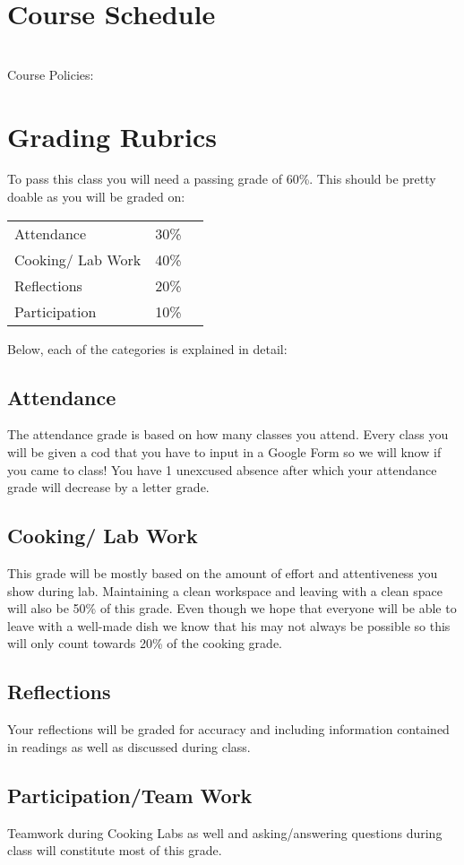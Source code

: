 \documentclass{article}
\begin{document}
\section*{Course Schedule }\\
Course Policies: 

\section{Grading Rubrics} 


To pass this class you will need a passing grade of 60\%. This should be pretty doable as you will be graded on:

\begin{table}[h]
\begin{tabular}{lll}
 Attendance &  30\% \\
 Cooking/ Lab Work & 40\%  \\
 Reflections &  20\%  \\
 Participation & 10\% \\ 
\end{tabular}
\end{table}   

Below, each of the categories is explained in detail:
\subsection{Attendance}
 The attendance grade is based on how many classes you attend. Every class you will be given a cod that you have to input in a Google Form so we will know if you came to class! You have 1 unexcused absence after which  your attendance grade will decrease by a letter grade.

\subsection{Cooking/ Lab Work} This grade will be mostly based on the amount of effort and attentiveness you show during lab. Maintaining a clean workspace and leaving with a clean space will also be 50\% of this grade. Even though we hope that everyone will be able to leave with a well-made dish we know that his may not always be possible so this will only count towards 20\% of the cooking grade.

\subsection{Reflections} Your reflections will be graded for accuracy and including information contained in readings as well as discussed during class.

\subsection{Participation/Team Work} Teamwork during Cooking Labs as well and asking/answering questions during class will constitute most of this grade.
\end{document}
